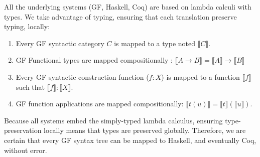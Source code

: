 \documentclass[11pt]{article}
\begin{document}





All the underlying systems (GF, Haskell, Coq) are based on lambda
calculi with types. We take advantage of typing, ensuring that each
translation preserve typing, locally:
\begin{enumerate}[noitemsep]
\item Every GF syntactic category $C$ is mapped to a type noted $⟦C⟧$.
\item GF Functional types are mapped compositionally : $⟦A → B⟧ = ⟦A⟧ → ⟦B⟧$
\item Every GF syntactic construction function ($f : X$) is mapped to a function $⟦f⟧$ such that $⟦f⟧ : ⟦X⟧$.
\item GF function applications are mapped compositionally: $⟦t(u)⟧ = ⟦t⟧ (⟦u⟧)$.
\end{enumerate}
Because all systems embed the simply-typed lambda calculus, ensuring
type-preservation locally means that types are preserved globally.
Therefore, we are certain that every GF syntax tree can be mapped to
Haskell, and eventually Coq, without error.
\end{document}
